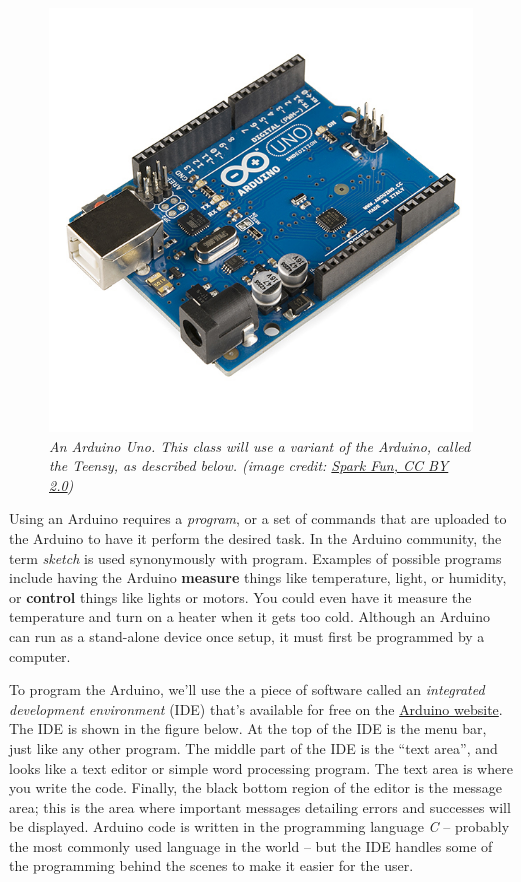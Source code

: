 \documentclass[]{book}
\begin{document}
\begin{figure}
\centering
\includegraphics{images/Arduino_Uno_-_R3.jpg}
\caption{\emph{An Arduino Uno. This class will use a variant of the Arduino, called the Teensy, as described below. (image credit: \href{https://commons.wikimedia.org/wiki/File:Arduino_Uno_-_R3.jpg}{Spark Fun, CC BY 2.0})}}
\end{figure}

Using an Arduino requires a \emph{program}, or a set of commands that are uploaded to the Arduino to have it perform the desired task. In the Arduino community, the term \emph{sketch} is used synonymously with program. Examples of possible programs include having the Arduino \textbf{measure} things like temperature, light, or humidity, or \textbf{control} things like lights or motors. You could even have it measure the temperature and turn on a heater when it gets too cold. Although an Arduino can run as a stand-alone device once setup, it must first be programmed by a computer.

To program the Arduino, we'll use the a piece of software called an \emph{integrated development environment} (IDE) that's available for free on the \href{http://www.arduino.cc}{Arduino website}. The IDE is shown in the figure below. At the top of the IDE is the menu bar, just like any other program. The middle part of the IDE is the ``text area'', and looks like a text editor or simple word processing program. The text area is where you write the code. Finally, the black bottom region of the editor is the message area; this is the area where important messages detailing errors and successes will be displayed. Arduino code is written in the programming language \emph{C} -- probably the most commonly used language in the world -- but the IDE handles some of the programming behind the scenes to make it easier for the user.
\end{document}
